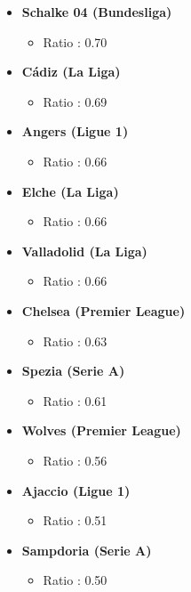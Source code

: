 \documentclass[
]{article}
\providecommand{\tightlist}{%
  \setlength{\itemsep}{0pt}\setlength{\parskip}{0pt}}
\begin{document}
\begin{itemize}
\tightlist
\item
  \textbf{Schalke 04 (Bundesliga)}

  \begin{itemize}
  \tightlist
  \item
    Ratio : 0.70
  \end{itemize}
\item
  \textbf{Cádiz (La Liga)}

  \begin{itemize}
  \tightlist
  \item
    Ratio : 0.69
  \end{itemize}
\item
  \textbf{Angers (Ligue 1)}

  \begin{itemize}
  \tightlist
  \item
    Ratio : 0.66
  \end{itemize}
\item
  \textbf{Elche (La Liga)}

  \begin{itemize}
  \tightlist
  \item
    Ratio : 0.66
  \end{itemize}
\item
  \textbf{Valladolid (La Liga)}

  \begin{itemize}
  \tightlist
  \item
    Ratio : 0.66
  \end{itemize}
\item
  \textbf{Chelsea (Premier League)}

  \begin{itemize}
  \tightlist
  \item
    Ratio : 0.63
  \end{itemize}
\item
  \textbf{Spezia (Serie A)}

  \begin{itemize}
  \tightlist
  \item
    Ratio : 0.61
  \end{itemize}
\item
  \textbf{Wolves (Premier League)}

  \begin{itemize}
  \tightlist
  \item
    Ratio : 0.56
  \end{itemize}
\item
  \textbf{Ajaccio (Ligue 1)}

  \begin{itemize}
  \tightlist
  \item
    Ratio : 0.51
  \end{itemize}
\item
  \textbf{Sampdoria (Serie A)}

  \begin{itemize}
  \tightlist
  \item
    Ratio : 0.50
  \end{itemize}
\end{itemize}
\end{document}
